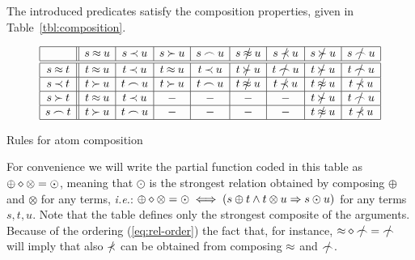 \begin{LEMMA} \label{le:composition}
The introduced predicates satisfy the composition properties, giv\-en in
Table~\ref {tbl:composition}.\vspace{-2ex}
\begin{table}[hbt]\MyLPar
\[\begin{array}{|c||c|c|c|c|c|c|c|c|}
\hline
          & s\Eq u   & s\Incl u & s\Cont u & s\Int u  
& s\notEq u   & s\notIncl u & s\notCont u & s\notInt u\\
\hline \hline
s\Eq t    & t\Eq u   & t\Incl u & t\Eq u   & t\Incl u 
& t\notCont u & t\notInt u  & t\notCont u & t\notInt u\\
\hline 
s\Incl t  & t\Cont u & t\Int u  & t\Cont u & t\Int u  
& t\notEq u   & t\notIncl u & t\notEq u   & t\notIncl u \\
\hline 
s\Cont t  & t\Eq u   & t\Incl u & -        & -        
& -           &    -        & t\notCont u & t\notInt u\\
\hline 
s\Int t   & t\Cont u & t\Int u  & -        & -        
& -           &    -        & t\notEq u   & t\notIncl u\\
\hline 
\end{array}\]\MyLPar
\caption{Rules for atom composition} \label{tbl:composition}\vspace{-3ex}
\end{table}
\end{LEMMA}
%
For convenience we will write the
partial function coded in this table as \(\oplus\diamond\otimes=\odot\), meaning
that $\odot$ is the strongest relation obtained by composing \(\oplus\) and
\(\otimes\) for any terms, {\em i.e.}:
\(\oplus\diamond\otimes=\odot\iff(s\oplus t\land t\otimes u\mathrel\Rightarrow s\odot u)\) 
for any terms $s,t,u$.
Note that the table defines only the strongest
composite of the arguments. Because of the ordering (\ref{eq:rel-order}) 
the fact that, for instance, \(\Comp\Eq\notInt=\notInt\)
will imply that also \(\notIncl\) can be obtained from composing \(\mathbin{\approx}\) and 
\(\notInt\).

